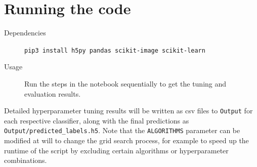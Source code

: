 \documentclass[landscape,twocolumn]{article}
\begin{document}
\printbibliography\appendix
\section{Running the code}
\begin{description}
	\item[Dependencies] \texttt{pip3 install h5py pandas scikit-image scikit-learn}
	\item[Usage] Run the steps in the notebook sequentially to get the tuning and evaluation results.
\end{description}

Detailed hyperparameter tuning results will be written as csv files to \texttt{Output} for each respective classifier, along with the final predictions as \texttt{Output/predicted\_labels.h5}. Note that the \texttt{ALGORITHMS} parameter can be modified at will to change the grid search process, for example to speed up the runtime of the script by excluding certain algorithms or hyperparameter combinations.
\end{document}
